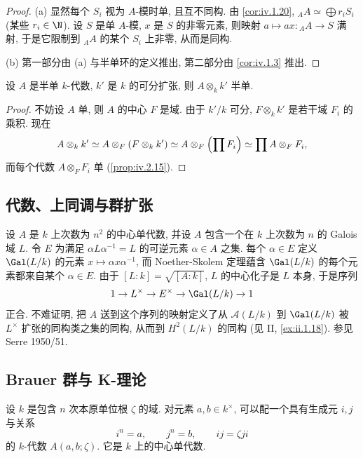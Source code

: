 \begin{proof}
(a) 显然每个 $S_i$ 视为 $A$-模时单, 且互不同构. 由 \ref{cor:iv.1.20}, ${}_A A\simeq\bigoplus r_iS_i$ (某些 $r_i\in\N$). 设 $S$ 是单 $A$-模, $x$ 是 $S$ 的非零元素, 则映射 $a\mapsto ax\colon {}_A A\to S$ 满射, 于是它限制到 ${}_A A$ 的某个 $S_i$ 上非零, 从而是同构.

(b) 第一部分由 (a) 与半单环的定义推出, 第二部分由 \ref{cor:iv.1.3} 推出.
\end{proof}

\begin{proposition}\label{prop:iv.5.6}
设 $A$ 是半单 $k$-代数, $k'$ 是 $k$ 的可分扩张, 则 $A\otimes_k k'$ 半单.
\end{proposition}

\begin{proof}
不妨设 $A$ 单, 则 $A$ 的中心 $F$ 是域. 由于 $k'/k$ 可分, $F\otimes_k k'$ 是若干域 $F_i$ 的乘积. 现在
\[
A\otimes_{k}k^{\prime}\simeq A\otimes_{F}(F\otimes_{k}k^{\prime})\simeq A\otimes_{F}\Bigl(\prod F_{i}\Bigr)\simeq\prod A\otimes_{F}F_{i},
\]
而每个代数 $A\otimes_F F_i$ 单 (\ref{prop:iv.2.15}).
\end{proof}

\subsection*{代数、上同调与群扩张}

设 $A$ 是 $k$ 上次数为 $n^2$ 的中心单代数, 并设 $A$ 包含一个在 $k$ 上次数为 $n$ 的 Galois 域 $L$. 令 $E$ 为满足 $\alpha L\alpha^{-1}=L$ 的可逆元素 $\alpha\in A$ 之集. 每个 $\alpha\in E$ 定义 $\Gal(L/k)$ 的元素 $x\mapsto\alpha x\alpha^{-1}$, 而 Noether-Skolem 定理蕴含 $\Gal(L/k)$ 的每个元素都来自某个 $\alpha\in E$. 由于 $[L:k]=\sqrt{[A:k]}$, $L$ 的中心化子是 $L$ 本身, 于是序列
\[
1\to L^{\times}\to E^{\times}\to\Gal(L/k)\to1
\]
正合. 不难证明, 把 $A$ 送到这个序列的映射定义了从 $\mathcal{A}(L/k)$ 到 $\Gal(L/k)$ 被 $L^{\times}$ 扩张的同构类之集的同构, 从而到 $H^2(L/k)$ 的同构 (见 II, \ref{ex:ii.1.18}). 参见 Serre 1950/51.

\subsection*{Brauer 群与 K-理论}

设 $k$ 是包含 $n$ 次本原单位根 $\zeta$ 的域. 对元素 $a,b\in k^{\times}$, 可以配一个具有生成元 $i,j$ 与关系
\[
i^{n}=a,\qquad j^{n}=b,\qquad ij=\zeta ji
\]
的 $k$-代数 $A(a,b;\zeta)$. 它是 $k$ 上的中心单代数.


